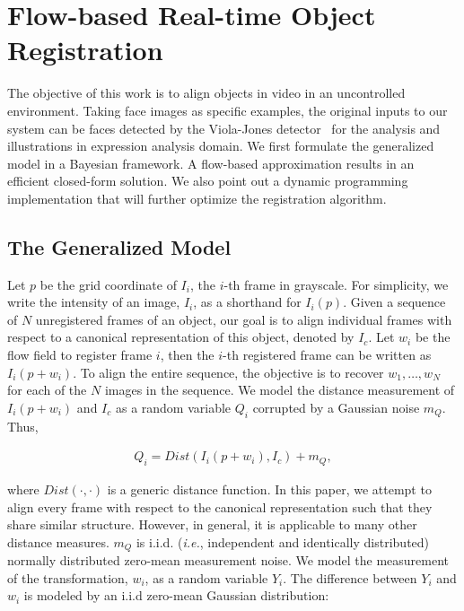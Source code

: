 \documentclass[review]{elsarticle}
\begin{document}
\section{\label{sec:approach}Flow-based Real-time Object Registration}

The objective of this work is to align objects in video in an uncontrolled environment. Taking face images as specific examples, the original inputs to our system can be faces detected by the Viola-Jones detector~\cite{Viola_IJCV04} for the analysis and illustrations in expression analysis domain. We first formulate the generalized model in a Bayesian framework. A flow-based approximation results in an efficient closed-form solution. We also point out a dynamic programming implementation that will further optimize the registration algorithm.

\subsection{\label{sec:model}The Generalized Model}

Let $p$ be the grid coordinate of $I_i$, the $i$-th frame in grayscale. For simplicity, we write the intensity of an image, $I_i$, as a shorthand for $I_i(p)$. Given a sequence of $N$ unregistered frames of an object, our goal is to align individual frames with respect to a canonical representation of this object, denoted by $I_c$. Let $w_i$ be the flow field to register frame $i$, then the $i$-th registered frame can be written as $I_i(p+w_i)$. To align the entire sequence, the objective is to recover $w_1,\ldots,w_N$ for each of the $N$ images in the sequence.  We model the distance measurement of $I_i(p+w_i)$ and $I_c$ as a random variable $Q_i$ corrupted by a Gaussian noise $m_Q$. Thus,

\begin{align}
\label{model:measurement}
Q_i=Dist(I_i(p+w_i),I_c)+m_Q,
\end{align}

\noindent where $Dist(\cdot,\cdot)$ is a generic distance function. In this paper, we attempt to align every frame with respect to the canonical representation such that they share similar structure. However, in general, it is applicable to many other distance measures. $m_Q$ is i.i.d. (\textit{i.e.}, independent and identically distributed) normally distributed zero-mean measurement noise. We model the measurement of the transformation, $w_i$, as a random variable $Y_i$. The difference between $Y_i$ and $w_i$ is modeled by an i.i.d zero-mean Gaussian distribution:
\end{document}
